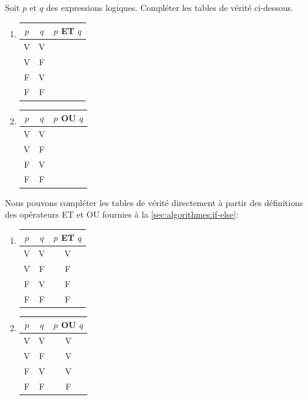 \begin{exercice}
  Soit $p$ et $q$ des expressions logiques. Compléter les tables de
  vérité ci-dessous.
  \begin{multicols}{2}
    \begin{enumerate}
    \item
      \begin{tabular}{ccc}
        \toprule
        $p$ & $q$ & $p$ ET $q$ \\
        \midrule
        V & V \\
        V & F \\
        F & V \\
        F & F \\
        \bottomrule
      \end{tabular}
      \columnbreak
    \item
      \begin{tabular}{ccc}
        \toprule
        $p$ & $q$ & $p$ OU $q$ \\
        \midrule
        V & V \\
        V & F \\
        F & V \\
        F & F \\
        \bottomrule
      \end{tabular}
    \end{enumerate}
  \end{multicols}
  \begin{sol}
    Nous pouvons compléter les tables de vérité directement à partir
    des définitions des opérateurs ET et OU fournies à la
    \autoref{sec:algorithmes:if-else}:
    \begin{multicols}{2}
      \begin{enumerate}
      \item
        \begin{tabular}{ccc}
          \toprule
          $p$ & $q$ & $p$ ET $q$ \\
          \midrule
          V & V & V \\
          V & F & F \\
          F & V & F \\
          F & F & F \\
          \bottomrule
        \end{tabular}
        \columnbreak
      \item
        \begin{tabular}{ccc}
          \toprule
          $p$ & $q$ & $p$ OU $q$ \\
          \midrule
          V & V & V \\
          V & F & V \\
          F & V & V \\
          F & F & F \\
          \bottomrule
        \end{tabular}
      \end{enumerate}
    \end{multicols}
  \end{sol}
\end{exercice}

